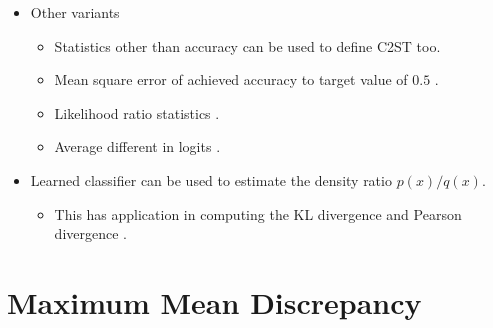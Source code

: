 \documentclass[10pt]{article}
\begin{document}
\begin{itemize}
    \item Other variants
    \begin{itemize}
        \item Statistics other than accuracy \cite{Raschka:2014} can be used to define C2ST too.
        \item Mean square error of achieved accuracy to target value of $0.5$ \cite{Kim:GL2ST:2019}.
        \item Likelihood ratio statistics \cite{Pandeva:2024}. 
        \item Average different in logits \cite{Cheng:CL2ST:2022}.
    \end{itemize}    

    \item Learned classifier can be used to estimate the density ratio $p(x)/q(x)$.
    \begin{itemize}
        \item This has application in computing the KL divergence \cite{Titsias:2019, Huszár:2017} and Pearson divergence \cite{Srivastava:2020}.
    \end{itemize}
\end{itemize}

\section{Maximum Mean Discrepancy}
\end{document}
